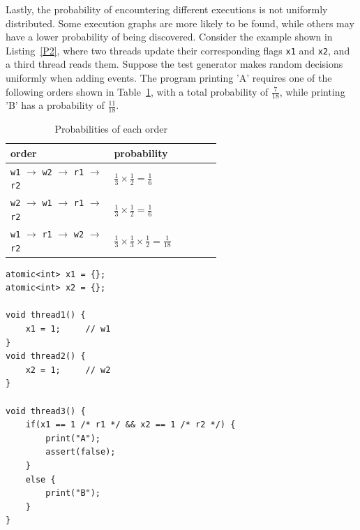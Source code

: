 



Lastly, the probability of encountering different executions is not uniformly distributed. Some execution graphs are more likely to be found, while others may have a lower probability of being discovered. Consider the example shown in Listing~\ref{P2}, where two threads update their corresponding flags \texttt{x1} and \texttt{x2}, and a third thread reads them. Suppose the test generator makes random decisions uniformly when adding events. The program printing 'A' requires one of the following orders shown in Table~\ref{tab:order-prob}, with a total probability of $\frac{7}{18}$, while printing 'B' has a probability of $\frac{11}{18}$.



\begin{table}[h]
    \centering
    \renewcommand{\arraystretch}{1.5} %
    \begin{tabular}{|p{0.3\linewidth}|p{0.3\linewidth}|}    
        \hline
        order & probability  \\ \hline
        \texttt{w1} $\rightarrow$ \texttt{w2} $\rightarrow$ \texttt{r1} $\rightarrow$ \texttt{r2}  & $\frac{1}{3} \times \frac{1}{2} = \frac{1}{6}$ \\  
        \texttt{w2} $\rightarrow$ \texttt{w1} $\rightarrow$ \texttt{r1} $\rightarrow$ \texttt{r2} & $\frac{1}{3} \times \frac{1}{2} = \frac{1}{6}$ \\  
        \texttt{w1} $\rightarrow$ \texttt{r1} $\rightarrow$ \texttt{w2} $\rightarrow$ \texttt{r2} & $\frac{1}{3} \times \frac{1}{3} \times \frac{1}{2} = \frac{1}{18}$    \\ 
        \hline
    \end{tabular}
    \caption{Probabilities of each order}
    \label{tab:order-prob}
\end{table}

\begin{lstlisting}[caption={P2}, label={P2}]
atomic<int> x1 = {};
atomic<int> x2 = {};

void thread1() {
    x1 = 1;     // w1 
}
void thread2() {
    x2 = 1;     // w2
}

void thread3() {
    if(x1 == 1 /* r1 */ && x2 == 1 /* r2 */) {    
        print("A");
        assert(false);
    }
    else {
        print("B");        
    }
}
\end{lstlisting}






